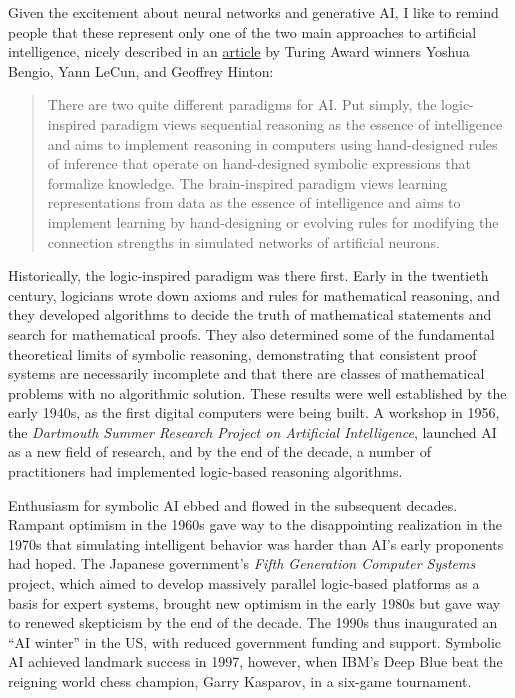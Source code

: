 \documentclass[11pt]{article}
\begin{document}
Given the excitement about neural networks and generative AI, I like to remind people that these represent only one of the two main approaches to artificial intelligence, nicely described in an \href{https://cacm.acm.org/research/deep-learning-for-ai/}{article} by Turing Award winners Yoshua Bengio, Yann LeCun, and Geoffrey Hinton:
\begin{quote}
 There are two quite different paradigms for AI. Put simply, the logic-inspired paradigm views sequential reasoning as the essence of intelligence and aims to implement reasoning in computers using hand-designed rules of inference that operate on hand-designed symbolic expressions that formalize knowledge. The brain-inspired paradigm views learning representations from data as the essence of intelligence and aims to implement learning by hand-designing or evolving rules for modifying the connection strengths in simulated networks of artificial neurons.
\end{quote}
Historically, the logic-inspired paradigm was there first. Early in the twentieth century, logicians wrote down axioms and rules for mathematical reasoning, and they developed algorithms to decide the truth of mathematical statements and search for mathematical proofs. They also determined some of the fundamental theoretical limits of symbolic reasoning, demonstrating that consistent proof systems are necessarily incomplete and that there are classes of mathematical problems with no algorithmic solution. These results were well established by the early 1940s, as the first digital computers were being built. A workshop in 1956, the \emph{Dartmouth Summer Research Project on Artificial Intelligence}, launched AI as a new field of research, and by the end of the decade, a number of practitioners had implemented logic-based reasoning algorithms.

Enthusiasm for symbolic AI ebbed and flowed in the subsequent decades. Rampant optimism in the 1960s gave way to the disappointing realization in the 1970s that simulating intelligent behavior was harder than AI's early proponents had hoped. The Japanese government's \emph{Fifth Generation Computer Systems} project, which aimed to develop massively parallel logic-based platforms as a basis for expert systems, brought new optimism in the early 1980s but gave way to renewed skepticism by the end of the decade. The 1990s thus inaugurated an ``AI winter'' in the US, with reduced government funding and support. Symbolic AI achieved landmark success in 1997, however, when IBM's Deep Blue beat the reigning world chess champion, Garry Kasparov, in a six-game tournament.
\end{document}
